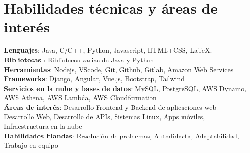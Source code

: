 \documentclass[a4paper,11pt]{article}
\makeatletter
\newcommand{\resumePOR}[3]{
\vspace{0.5mm}\item
    \begin{tabular*}{0.97\textwidth}[t]{l@{\extracolsep{\fill}}r}
        \textbf{#1}\hspace{0.3mm}#2 & \textit{\small{#3}} 
    \end{tabular*}
    \vspace{-2mm}
}
\newcommand{\resumeSubHeadingListStart}{\begin{itemize}[leftmargin=*,labelsep=0mm]}
\newcommand{\resumeItemListStart}{\begin{justify}\begin{itemize}[leftmargin=3ex, rightmargin=2ex, noitemsep,labelsep=1.2mm,itemsep=0mm]\small}
\newcommand{\resumeSubHeadingListEnd}{\end{itemize}\vspace{2mm}}
\newcommand{\resumeItemListEnd}{\end{itemize}\end{justify}\vspace{-2mm}}
\makeatother
\begin{document}
\section{\textbf{Habilidades técnicas y áreas de interés}}
 \begin{itemize}[leftmargin=0.05in, label={}]
    \small{\item{
     \textbf{Lenguajes}{: Java, C/C++, Python, Javascript, HTML+CSS, LaTeX. } \\
     \textbf{Bibliotecas }{: Bibliotecas varias de Java y Python }\\ 
     \textbf{Herramientas}{: Nodejs, VScode, Git, Github, Gitlab, Amazon Web Services } \\ 
     \textbf{Frameworks}{: Django, Angular, Vue.js, Bootstrap, Tailwind } \\
     \textbf{Servicios en la nube y bases de datos}{: MySQL, PostgreSQL, AWS Dynamo, AWS Athena, AWS Lambda, AWS Cloudformation } \\   
     \textbf{Áreas de interés}{: Desarrollo Frontend y Backend de aplicaciones web, Desarrollo Web, Desarrollo de APIs, Sistemas Linux, Apps móviles, Infraestructura en la nube } \\
     \textbf{Habilidades blandas}{: Resolución de problemas, Autodidacta, Adaptabilidad, Trabajo en equipo} \\
    }}
 \end{itemize}
 \vspace{-16pt}



\begin{comment}
\section{\textbf{Positions of Responsibility}}
\vspace{-0.4mm}
\resumeSubHeadingListStart
\resumePOR{On Desk Registrations Volunteer } %
    {Aarhant Cyber Week Event - RCOEM, Nagpur} %
    {Oct - Dec 2022} %
    \resumeItemListStart
    \item {Helped to attract close to 300 attendees to the event.}
    \item {Collected over Rs. 20,000 in entry fees for different activities.}
    \resumeItemListEnd

\resumeSubHeadingListEnd
\vspace{-5mm}
\end{comment}
\end{document}
